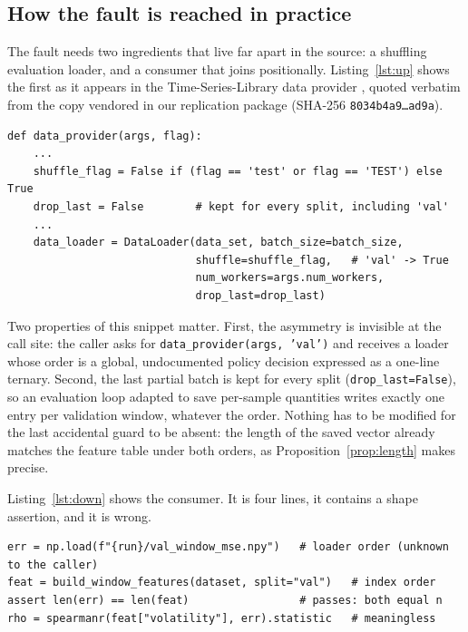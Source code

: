 \documentclass[a4paper,fleqn]{cas-sc}
\begin{document}
\subsection{How the fault is reached in practice}
\label{sec:reached}

The fault needs two ingredients that live far apart in the source: a shuffling
evaluation loader, and a consumer that joins positionally. Listing~\ref{lst:up}
shows the first as it appears in the Time-Series-Library data provider
\citep{tslib}, quoted verbatim from the copy vendored in our replication package
(SHA-256 \texttt{8034b4a9\ldots ad9a}).

\begin{lstlisting}[caption={The provider that makes the fault reachable, quoted
verbatim. Only \texttt{test} is protected, and the last partial batch is kept for
every split. The flag is correct for its intended purpose---the validation split
is consumed through a mean---and becomes a hazard the moment a per-sample artefact
is stored from the validation split.},label={lst:up}]
def data_provider(args, flag):
    ...
    shuffle_flag = False if (flag == 'test' or flag == 'TEST') else True
    drop_last = False        # kept for every split, including 'val'
    ...
    data_loader = DataLoader(data_set, batch_size=batch_size,
                             shuffle=shuffle_flag,   # 'val' -> True
                             num_workers=args.num_workers,
                             drop_last=drop_last)
\end{lstlisting}

Two properties of this snippet matter. First, the asymmetry is invisible at the
call site: the caller asks for \texttt{data\_provider(args, 'val')} and receives a
loader whose order is a global, undocumented policy decision expressed as a
one-line ternary. Second, the last partial batch is kept for every split
(\texttt{drop\_last=False}), so an evaluation loop adapted to save per-sample
quantities writes exactly one entry per validation window, whatever the order.
Nothing has to be modified for the last accidental guard to be absent: the length
of the saved vector already matches the feature table under both orders, as
Proposition~\ref{prop:length} makes precise.

Listing~\ref{lst:down} shows the consumer. It is four lines, it contains a shape
assertion, and it is wrong.

\begin{lstlisting}[caption={The consumer. The assertion passes, the join is
wrong, and no exception is ever raised.},label={lst:down}]
err = np.load(f"{run}/val_window_mse.npy")   # loader order (unknown to the caller)
feat = build_window_features(dataset, split="val")   # index order
assert len(err) == len(feat)                 # passes: both equal n
rho = spearmanr(feat["volatility"], err).statistic   # meaningless
\end{lstlisting}
\end{document}
